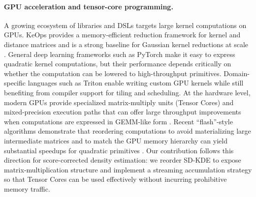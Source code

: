 \paragraph{GPU acceleration and tensor-core programming.}
A growing ecosystem of libraries and DSLs targets large kernel computations on GPUs.
KeOps provides a memory-efficient reduction framework for kernel and distance matrices and is a strong baseline for Gaussian kernel reductions at scale \citep{charlier2021keops}.
General deep learning frameworks such as PyTorch \citep{paszke2019pytorch} make it easy to express quadratic kernel computations, but their performance depends critically on whether the computation can be lowered to high-throughput primitives.
Domain-specific languages such as Triton \citep{tillet2019triton} enable writing custom GPU kernels while still benefiting from compiler support for tiling and scheduling.
At the hardware level, modern GPUs provide specialized matrix-multiply units (Tensor Cores) and mixed-precision execution paths that can offer large throughput improvements when computations are expressed in GEMM-like form \citep{micikevicius2017mixed, williams2009roofline}.
Recent ``flash''-style algorithms demonstrate that reordering computations to avoid materializing large intermediate matrices and to match the GPU memory hierarchy can yield substantial speedups for quadratic primitives \citep{dao2022flashattention}.
Our contribution follows this direction for score-corrected density estimation: we reorder SD-KDE to expose matrix-multiplication structure and implement a streaming accumulation strategy so that Tensor Cores can be used effectively without incurring prohibitive memory traffic.
